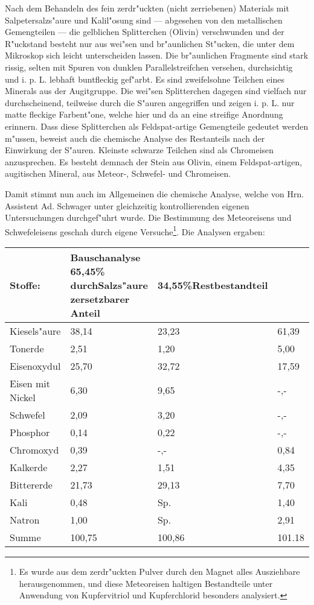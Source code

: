 \documentclass[a4paper, 11pt, oneside]{article}
\begin{document}
Nach dem Behandeln des fein zerdr"uckten (nicht zerriebenen) Materials mit Salpetersalzs"aure und Kalil"osung sind --- abgesehen von den metallischen Gemengteilen --- die gelblichen Splitterchen (Olivin) verschwunden und der R"uckstand besteht nur aus wei"sen und br"aunlichen St"ucken, die unter dem Mikroskop sich leicht unterscheiden lassen. Die br"aunlichen Fragmente sind stark rissig, selten mit Spuren von dunklen Parallelstreifchen versehen, durchsichtig und i. p. L. lebhaft buntfleckig gef"arbt. Es sind zweifelsohne Teilchen eines Minerals aus der Augitgruppe. Die wei"sen Splitterchen dagegen sind vielfach nur durchscheinend, teilweise durch die S"auren angegriffen und zeigen i. p. L. nur matte fleckige Farbent"one, welche hier und da an eine streifige Anordnung erinnern. Dass diese Splitterchen als Feldspat-artige Gemengteile gedeutet werden m"ussen, beweist auch die chemische Analyse des Restanteils nach der Einwirkung der S"auren. Kleinste schwarze Teilchen sind als Chromeisen anzusprechen. Es besteht demnach der Stein aus Olivin, einem Feldspat-artigen, augitischen Mineral, aus Meteor-, Schwefel- und Chromeisen.

Damit stimmt nun auch im Allgemeinen die chemische Analyse, welche von Hrn. Assistent Ad. Schwager unter gleichzeitig kontrollierenden eigenen Untersuchungen durchgef"uhrt wurde. Die Bestimmung des Meteoreisens und Schwefeleisens geschah durch eigene Versuche\footnote{Es wurde aus dem zerdr"uckten Pulver durch den Magnet alles Ausziehbare herausgenommen, und diese Meteoreisen haltigen Bestandteile unter Anwendung von Kupfervitriol und Kupferchlorid besonders analysiert.}. Die Analysen ergaben:
\begin{center}
\begin{tabular}{ |p{27mm}|p{35mm}|p{25mm}|p{10mm}| }
    \hline
    Stoffe: & Bauschanalyse 65,45\% durch\newline Salzs"aure zersetzbarer Anteil & 34,55\%\newline Restbestandteil & \\
    \hline\hline
    Kiesels"aure & 38,14 & 23,23 & 61,39\\\hline
    Tonerde & 2,51 & 1,20 & 5,00\\\hline
    Eisenoxydul & 25,70 & 32,72 & 17,59\\\hline
    Eisen mit Nickel & 6,30 & 9,65 & -,-\\\hline
    Schwefel & 2,09 & 3,20 & -,-\\\hline
    Phosphor & 0,14 & 0,22 & -,-\\\hline
    Chromoxyd & 0,39 & -,- & 0,84\\\hline
    Kalkerde & 2,27 & 1,51 & 4,35\\\hline
    Bittererde & 21,73 & 29,13 & 7,70\\\hline
    Kali & 0,48 & Sp. & 1,40\\\hline
    Natron & 1,00 & Sp. & 2,91\\\hline
    Summe & 100,75 & 100,86 & 101.18\\
    \hline
\end{tabular}
\end{center}
\end{document}
